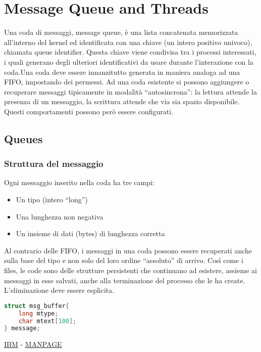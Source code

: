 \section{Message Queue and Threads}
    Una  coda  di  messaggi,  message  queue,  è  una  lista  concatenata  memorizzata all'interno  del  kernel  ed  identificata  con  una  chiave  (un  intero  positivo  univoco), chiamata queue identifier. Questa  chiave  viene  condivisa  tra  i  processi  interessati,  i  quali  generano  degli ulteriori identificativi da usare durante l'interazione con la coda.Una  coda  deve  essere  innanzitutto  generata  in  maniera  analoga  ad  una  FIFO, impostando dei permessi. Ad una coda esistente si possono aggiungere o recuperare messaggi tipicamente in modalità “autosincrona”: la lettura attende la presenza di un messaggio, la scrittura attende che via sia spazio disponibile. Questi comportamenti possono però essere configurati.
    
    \subsection{Queues}
        \subsubsection{Struttura del messaggio}
        Ogni messaggio inserito nella coda ha tre campi:
        \begin{itemize}
            \item Un tipo (intero “long”)
            \item Una lunghezza non negativa
            \item Un insieme di dati (bytes) di lunghezza corretta
        \end{itemize}
        
        Al contrario delle FIFO, i messaggi in una coda possono essere recuperati anche sulla base del tipo e non solo del loro ordine “assoluto” di arrivo. Così come i files, le code sono delle strutture persistenti che continuano ad esistere, assieme ai messaggi in esse salvati, anche alla terminazione del processo che le ha create. L'eliminazione deve essere esplicita.
        
        \begin{lstlisting}[language=C]
struct msg_buffer{
    long mtype;
    char mtext[100];
} message;
        \end{lstlisting}
        \href{https://www.ibm.com/docs/en/aix/7.1?topic=files-msgh-file}{IBM} - \href{https://www.man7.org/linux/man-pages/man0/sys_msg.h.0p.html}{MANPAGE}

